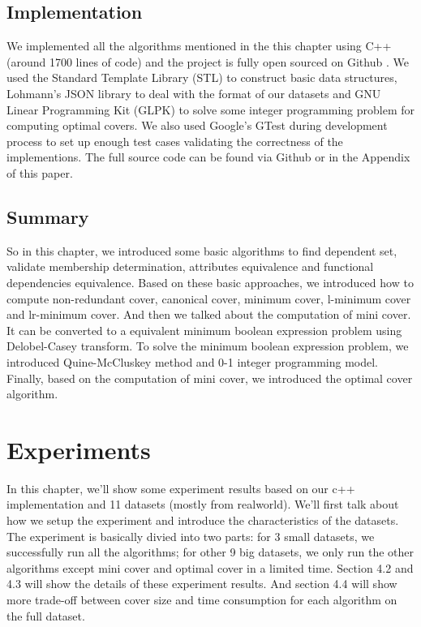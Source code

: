 \documentclass[11pt]{book}
\begin{document}
\section{Implementation}

We implemented all the algorithms mentioned in the this chapter using C++ (around 1700 lines of code) and the project is fully open sourced on Github \cite{githubfdc}. We used the Standard Template Library (STL) \cite{plauger2000c++} to construct basic data structures, Lohmann's JSON library \cite{nlohmann_json} to deal with the format of our datasets and GNU Linear Programming Kit (GLPK) \cite{makhorin2008glpk} to solve some integer programming problem for computing optimal covers. We also used Google's GTest \cite{barca2016gtest} during development process to set up enough test cases validating the correctness of the implementions. The full source code can be found via Github \cite{githubfdc} or in the Appendix of this paper.

\section{Summary}

So in this chapter, we introduced some basic algorithms to find dependent set, validate membership determination, attributes equivalence and functional dependencies equivalence. Based on these basic approaches, we introduced how to compute non-redundant cover, canonical cover, minimum cover, l-minimum cover and lr-minimum cover. And then we talked about the computation of mini cover. It can be converted to a equivalent minimum boolean expression problem using Delobel-Casey transform. To solve the minimum boolean expression problem, we introduced Quine-McCluskey method and 0-1 integer programming model. Finally, based on the computation of mini cover, we introduced the optimal cover algorithm.

\chapter{Experiments}

In this chapter, we'll show some experiment results based on our c++ implementation and 11 datasets (mostly from realworld). We'll first talk about how we setup the experiment and introduce the characteristics of the datasets. The experiment is basically divied into two parts: for 3 small datasets, we successfully run all the algorithms; for other 9 big datasets, we only run the other algorithms except mini cover and optimal cover in a limited time. Section 4.2 and 4.3 will show the details of these experiment results. And section 4.4 will show more trade-off between cover size and time consumption for each algorithm on the full dataset.
\end{document}
